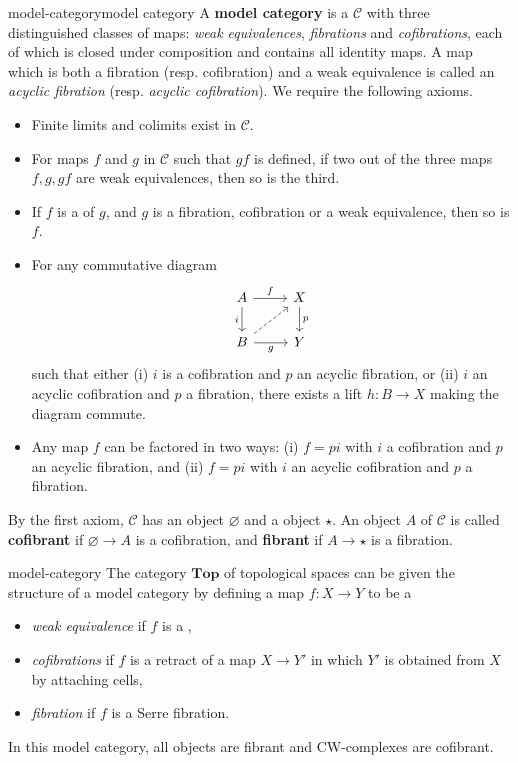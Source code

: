 \begin{topic}{model-category}{model category}
    A \textbf{model category} is a  $\mathcal{C}$ with three distinguished classes of maps: \textit{weak equivalences}, \textit{fibrations} and \textit{cofibrations}, each of which is closed under composition and contains all identity maps. A map which is both a fibration (resp. cofibration) and a weak equivalence is called an \textit{acyclic fibration} (resp. \textit{acyclic cofibration}). We require the following axioms.
    \begin{itemize}
        \item Finite limits and colimits exist in $\mathcal{C}$.
        \item For maps $f$ and $g$ in $\mathcal{C}$ such that $gf$ is defined, if two out of the three maps $f, g, gf$ are weak equivalences, then so is the third.
        \item If $f$ is a  of $g$, and $g$ is a fibration, cofibration or a weak equivalence, then so is $f$.
        \item For any commutative diagram
        \[ \begin{tikzcd} A \arrow[swap]{d}{i} \arrow{r}{f} & X \arrow{d}{p} \\ B \arrow[swap]{r}{g} \arrow[dashed]{ur} & Y \end{tikzcd} \]
        such that either (i) $i$ is a cofibration and $p$ an acyclic fibration, or (ii) $i$ an acyclic cofibration and $p$ a fibration, there exists a lift $h : B \to X$ making the diagram commute.
        \item Any map $f$ can be factored in two ways: (i) $f = pi$ with $i$ a cofibration and $p$ an acyclic fibration, and (ii) $f = pi$ with $i$ an acyclic cofibration and $p$ a fibration.
    \end{itemize}
    
    By the first axiom, $\mathcal{C}$ has an  object $\varnothing$ and a  object $\star$. An object $A$ of $\mathcal{C}$ is called \textbf{cofibrant} if $\varnothing \to A$ is a cofibration, and \textbf{fibrant} if $A \to \star$ is a fibration.
\end{topic}

\begin{example}{model-category}
    The category $\textbf{Top}$ of topological spaces can be given the structure of a model category by defining a map $f : X \to Y$ to be a
    \begin{itemize}
        \item \textit{weak equivalence} if $f$ is a ,
        \item \textit{cofibrations} if $f$ is a retract of a map $X \to Y'$ in which $Y'$ is obtained from $X$ by attaching cells,
        \item \textit{fibration} if $f$ is a Serre fibration.
    \end{itemize}
    In this model category, all objects are fibrant and CW-complexes are cofibrant.
\end{example}

